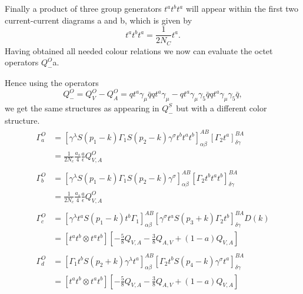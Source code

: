 	Finally a product of three group generators $t^at^bt^a$ will appear within the first two current-current diagrams a and b, which is given by
        \begin{equation}
                \label{eq:tatbta}
                t^a t^b t^a = \frac{1}{2N_C}t^a.
        \end{equation}
	Having obtained all needed colour relations we now can evaluate the octet operators $Q^O_-$a.
	\par	
	Hence using the operators
	\begin{equation}
		Q_-^O = Q^O_V - Q^O_A = q t^a \gamma_\mu \bar q q t^a \gamma_\mu - q t^a \gamma_\mu \gamma_5 \bar q q t^a \gamma_\mu \gamma_5 \bar q, 
	\end{equation}	
	we get the same structures as appearing in $Q^S_-$ but with a different color structure. 
	\begin{align}
		\begin{split}
			\Gamma^O_a &= [\gamma^\lambda S(p_1-k) \Gamma_1 S(p_2 - k) \gamma^\sigma t^b t^a t^b]^{AB}_{\alpha\beta} [\Gamma_2 t^a]^{BA}_{\delta\gamma}  \\
			&= \frac{1}{2N_c} \frac{a_s}{4} \frac{a}{\epsilon} Q^O_{V,A} 
		\end{split} \\
		\begin{split} 
			\Gamma^O_b &= [\gamma^\lambda S(p_1-k) \Gamma_1 S(p_2 - k) \gamma^\sigma]^{AB}_{\alpha\beta} [\Gamma_2 t^b t^a t^b]^{BA}_{\delta\gamma}  \\
			&= \frac{1}{2N_c} \frac{a_s}{4} \frac{a}{\epsilon} Q^O_{V,A} 
		\end{split} \\
		\begin{split}
			\Gamma^O_c &= \left[ \gamma^\lambda t^a S(p_1 -k) t^b \Gamma_1 \right]^{AB}_{\alpha\beta} \left[ \gamma^\sigma t^a S(p_3 + k) \Gamma_2 t^b \right]^{BA}_{\delta\gamma} D(k)  \\
			&= [t^a t^b \otimes t^a t^b ] \left[-\frac{5}{8}Q_{V,A} - \frac{3}{8} Q_{A,V} + (1-a) Q_{V,A}\right] 
		\end{split} \\
		\begin{split}
			\Gamma^O_d &=  \left[ \Gamma_1 t^b S(p_2 + k) \gamma^\lambda t^a \right]^{AB}_{\alpha\beta} \left[ \Gamma_2 t^b S(p_4-k) \gamma^\sigma t^a \right]^{BA}_{\delta\gamma} \\
			&= [t^a t^b \otimes t^a t^b ] \left[-\frac{5}{8}Q_{V,A} - \frac{3}{8} Q_{A,V} + (1-a) Q_{V,A}\right] 
		\end{split} \\	

\end{align}
